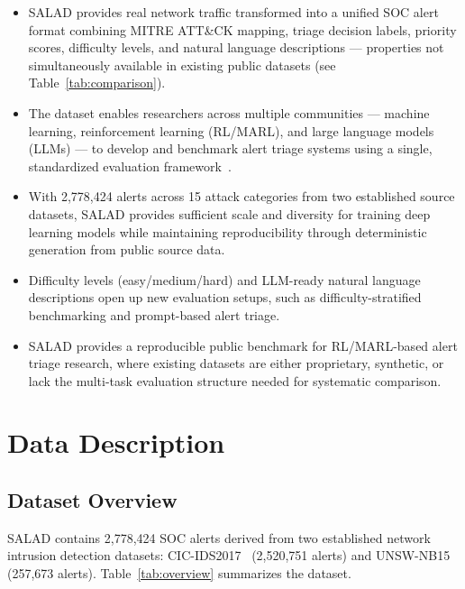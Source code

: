 \documentclass[review]{elsarticle}
\begin{document}
\begin{itemize}
\item SALAD provides real network traffic transformed into a unified SOC alert format combining MITRE ATT\&CK mapping, triage decision labels, priority scores, difficulty levels, and natural language descriptions --- properties not simultaneously available in existing public datasets (see Table~\ref{tab:comparison}).

\item The dataset enables researchers across multiple communities --- machine learning, reinforcement learning (RL/MARL), and large language models (LLMs) --- to develop and benchmark alert triage systems using a single, standardized evaluation framework~\cite{veeramachaneni2016aianalyst}.

\item With 2,778,424 alerts across 15 attack categories from two established source datasets, SALAD provides sufficient scale and diversity for training deep learning models while maintaining reproducibility through deterministic generation from public source data.

\item Difficulty levels (easy/medium/hard) and LLM-ready natural language descriptions open up new evaluation setups, such as difficulty-stratified benchmarking and prompt-based alert triage.

\item SALAD provides a reproducible public benchmark for RL/MARL-based alert triage research, where existing datasets are either proprietary, synthetic, or lack the multi-task evaluation structure needed for systematic comparison.
\end{itemize}


\section{Data Description}

\subsection{Dataset Overview}

SALAD contains 2,778,424 SOC alerts derived from two established network intrusion detection datasets: CIC-IDS2017~\cite{sharafaldin2018} (2,520,751 alerts) and UNSW-NB15~\cite{moustafa2015} (257,673 alerts). Table~\ref{tab:overview} summarizes the dataset.
\end{document}
